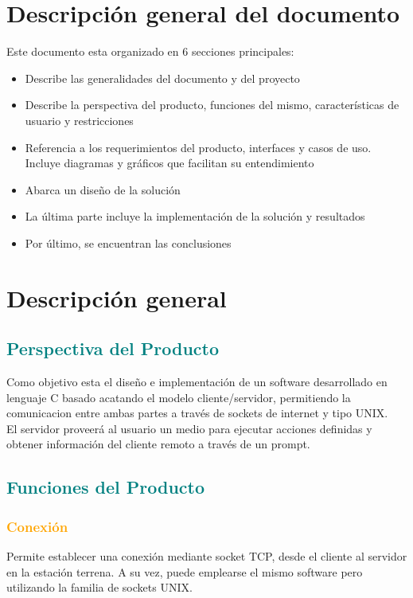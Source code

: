 \documentclass[fontsize=12pt]{article}
\begin{document}
\section{\textbf{Descripción general del documento}} \label{gral2}
Este documento esta organizado en 6 secciones principales:
\begin{itemize}
\item \label{gra2l}Describe las generalidades del documento y del proyecto
\item \label{dgral} Describe la perspectiva del producto, funciones del mismo, características de usuario y restricciones
\item \label{reqesp} Referencia a los requerimientos del producto, interfaces y casos de uso. Incluye diagramas y gráficos que facilitan su entendimiento
\item \label{diseno} Abarca un diseño de la solución
\item \label{implyresult} La última parte incluye la implementación de la solución y resultados
\item \label{concl} Por último, se encuentran las conclusiones
\end{itemize}


\section{\textbf{Descripción general}} \label{dgral}
\subsection{\textcolor{teal}{\textbf{Perspectiva del Producto}}}
Como objetivo esta el diseño e implementación de un software desarrollado
en lenguaje C basado acatando el modelo cliente/servidor, permitiendo
la comunicacion entre ambas partes a través de sockets de internet y tipo UNIX.\\
El servidor proveerá al usuario un medio para ejecutar acciones definidas y obtener información del cliente remoto a través de un prompt.
\subsection{\textcolor{teal}{\textbf{Funciones del Producto}}}
\subsubsection{\textcolor{orange}{\textbf{Conexión}}}
Permite establecer una conexión mediante socket TCP, desde el cliente al
servidor en la estación terrena. A su vez, puede emplearse el mismo software pero utilizando
la familia de sockets UNIX.
\end{document}
